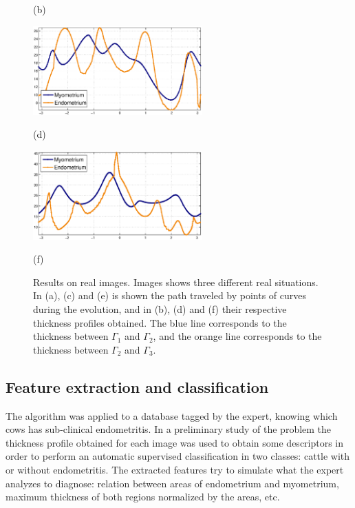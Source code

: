 \documentclass{article}
\begin{document}
\begin{figure}[t]
\begin{minipage}[b]{.33\linewidth}
  \centerline{(b)}\medskip
\end{minipage}
\hfill
\begin{minipage}[b]{.33\linewidth}
  \centering
  \centerline{\includegraphics[width=6.5cm]{pics/realWidth4}}
  \centerline{(d)}\medskip
\end{minipage}
\hfill
\begin{minipage}[b]{.33\linewidth}
  \centering
  \centerline{\includegraphics[width=6.5cm]{pics/realWidth3}}
  \centerline{(f)}\medskip
\end{minipage}
\caption{Results on real images. Images shows three different real situations. In (a), (c) and (e) is shown the path traveled by points of curves during the evolution, and in (b), (d) and (f) their respective thickness profiles obtained. The blue line corresponds to the thickness between $\Gamma_1$ and $\Gamma_2$, and the orange line corresponds to the thickness between $\Gamma_2$ and $\Gamma_3$.}
\label{fig:real}
\end{figure}

\subsection{Feature extraction and classification}
\label{ssec:clasification}
The algorithm was applied to a database tagged by the expert, knowing which cows has sub-clinical endometritis. In a preliminary study of the problem the thickness profile obtained for each image was used to obtain some descriptors in order to perform an automatic supervised classification in two classes: cattle with or without endometritis. The extracted features try to simulate what the expert analyzes to diagnose: relation between areas of endometrium and myometrium, maximum thickness of both regions normalized by the areas, etc.
\end{document}

